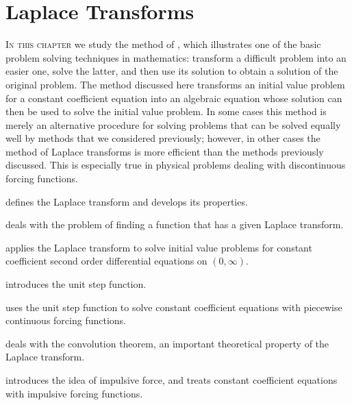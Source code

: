 
\chapter{Laplace Transforms}\label{ch:laplace}

\textsc{In this chapter}
 we study the method of
, which illustrates one of
the basic problem solving techniques in mathematics:
transform a difficult problem into an easier one, solve the latter,
and then use its solution to obtain a solution of the original
problem. The method discussed here
transforms an initial value problem for a constant coefficient
equation into an algebraic equation whose solution can then be used to
solve the initial value problem. In some cases this method is merely
an alternative procedure for solving problems that can be solved
equally well by methods that we considered previously;     however,
in other cases  the method of Laplace transforms is more efficient
than the methods previously discussed. This is especially true
in physical problems dealing with discontinuous forcing functions.


\medskip
\noindent
{} defines the Laplace transform and
develops its properties.

\medskip
\noindent
{} deals with
the problem of finding a function that has a given Laplace transform.

\medskip
\noindent
{} applies the Laplace transform to solve
initial value problems for constant coefficient second order
differential equations on $(0,\infty)$.

\medskip
\noindent
{}
introduces the unit step function.

\medskip
\noindent
{} uses the unit step
function to solve constant coefficient equations with piecewise
continuous forcing functions.

\medskip
\noindent
{} deals with the
convolution theorem, an important theoretical property of the Laplace
transform.

\medskip
\noindent
{} introduces the idea of
impulsive force, and treats constant coefficient equations with
impulsive forcing functions.



